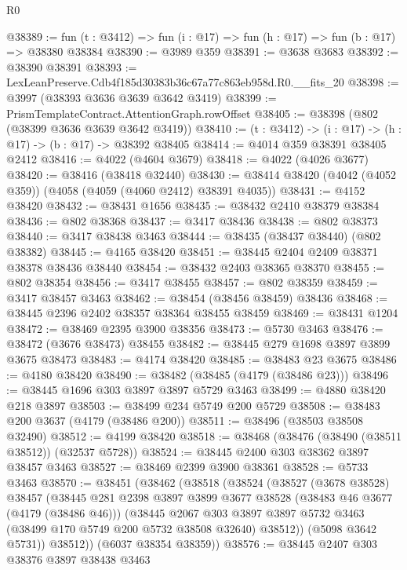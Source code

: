 \begin{lexlean}{R0}
\begin{coremodule}
@38389 := fun (t : @3412) => fun (i : @17) => fun (h : @17) => fun (b : @17) => @38380 @38384
@38390 := @3989 @359
@38391 := @3638 @3683
@38392 := @38390 @38391
@38393 := LexLeanPreserve.Cdb4f185d30383b36c67a77c863eb958d.R0.__fits_20
@38398 := @3997 (@38393 @3636 @3639 @3642 @3419)
@38399 := PrismTemplateContract.AttentionGraph.rowOffset
@38405 := @38398 (@802 (@38399 @3636 @3639 @3642 @3419))
@38410 := (t : @3412) -> (i : @17) -> (h : @17) -> (b : @17) -> @38392 @38405
@38414 := @4014 @359 @38391 @38405 @2412
@38416 := @4022 (@4604 @3679)
@38418 := @4022 (@4026 @3677)
@38420 := @38416 (@38418 @32440)
@38430 := @38414 @38420 (@4042 (@4052 @359)) (@4058 (@4059 (@4060 @2412) @38391 @4035))
@38431 := @4152 @38420
@38432 := @38431 @1656
@38435 := @38432 @2410 @38379 @38384
@38436 := @802 @38368
@38437 := @3417 @38436
@38438 := @802 @38373
@38440 := @3417 @38438 @3463
@38444 := @38435 (@38437 @38440) (@802 @38382)
@38445 := @4165 @38420
@38451 := @38445 @2404 @2409 @38371 @38378 @38436 @38440
@38454 := @38432 @2403 @38365 @38370
@38455 := @802 @38354
@38456 := @3417 @38455
@38457 := @802 @38359
@38459 := @3417 @38457 @3463
@38462 := @38454 (@38456 @38459) @38436
@38468 := @38445 @2396 @2402 @38357 @38364 @38455 @38459
@38469 := @38431 @1204
@38472 := @38469 @2395 @3900 @38356
@38473 := @5730 @3463
@38476 := @38472 (@3676 @38473) @38455
@38482 := @38445 @279 @1698 @3897 @3899 @3675 @38473
@38483 := @4174 @38420
@38485 := @38483 @23 @3675
@38486 := @4180 @38420
@38490 := @38482 (@38485 (@4179 (@38486 @23)))
@38496 := @38445 @1696 @303 @3897 @3897 @5729 @3463
@38499 := @4880 @38420 @218 @3897
@38503 := @38499 @234 @5749 @200 @5729
@38508 := @38483 @200 @3637 (@4179 (@38486 @200))
@38511 := @38496 (@38503 @38508 @32490)
@38512 := @4199 @38420
@38518 := @38468 (@38476 (@38490 (@38511 @38512)) (@32537 @5728))
@38524 := @38445 @2400 @303 @38362 @3897 @38457 @3463
@38527 := @38469 @2399 @3900 @38361
@38528 := @5733 @3463
@38570 := @38451
    (@38462
      (@38518
        (@38524
          (@38527
            (@3678 @38528)
            @38457
            (@38445
              @281
              @2398
              @3897
              @3899
              @3677
              @38528
              (@38483 @46 @3677 (@4179 (@38486 @46)))
              (@38445
                @2067
                @303
                @3897
                @3897
                @5732
                @3463
                (@38499 @170 @5749 @200 @5732 @38508 @32640)
                @38512))
            (@5098 @3642 @5731))
          @38512))
      (@6037 @38354 @38359))
@38576 := @38445 @2407 @303 @38376 @3897 @38438 @3463

\end{coremodule}
\end{lexlean}

